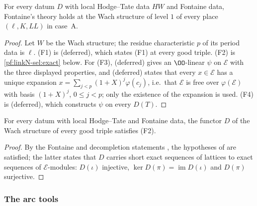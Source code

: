 \begin{theorem}\label{pf:linkN-sel:fontaine}
For every datum $D$ with local Hodge--Tate data $HW$ and Fontaine data, Fontaine's theory holds at the Wach structure of level $1$ of every
place $(\ell,K,\mathit{LL})$ in case~A.
\end{theorem}

\begin{proof}
Let $W$ be the Wach structure; the residue characteristic $p$ of its period data is $\ell$. (F1) is
 (deferred), which states (F1) at every good triple. (F2) is
\cref{pf:linkN-sel:exact} below. For (F3),  (deferred) gives an
$\OO$-linear $\psi$ on $\mathcal E$ with the three displayed properties, and 
(deferred) states that every $x\in\mathcal E$ has a unique expansion $x=\sum_{j<p}(1+X)^j\varphi(c_j)$, i.e.\ that $\mathcal E$ is free over
$\varphi(\mathcal E)$ with basis $(1+X)^j$, $0\le j<p$; only the existence of the expansion is used. (F4) is
 (deferred), which constructs $\psi$ on every $D(T)$.
\end{proof}

\begin{lemma}\label{pf:linkN-sel:exact}
For every datum with local Hodge--Tate and Fontaine data, the functor $D$ of the Wach structure of every good triple satisfies (F2).
\end{lemma}

\begin{proof}
By the Fontaine and decompletion statements , the hypotheses of
 are satisfied; the latter states that $D$ carries short exact sequences of lattices to exact
sequences of $\mathcal E$-modules: $D(\iota)$ injective, $\ker D(\pi)=\operatorname{im}D(\iota)$ and $D(\pi)$ surjective.
\end{proof}

\subsubsection{The arc tools}

